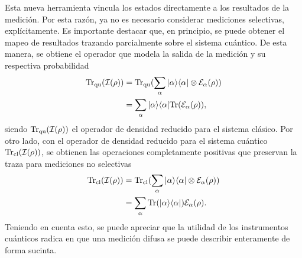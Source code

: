 

Esta nueva herramienta vincula los estados directamente a los resultados de la
medición. Por esta razón, ya no es necesario considerar mediciones selectivas,
explícitamente.  Es importante destacar que, en principio, se puede obtener el
mapeo de resultados trazando parcialmente sobre el sistema cuántico. De
esta manera, se obtiene el operador que modela la salida de la medición y su
respectiva probabilidad 
\begin{equation}
    \begin{split}
    {\rm Tr}_{\text{qu}}(\mathcal{I}(\rho))&={\rm Tr}_{\text{qu}}(\sum_\alpha |\alpha\rangle \langle\alpha|\otimes \mathcal{E}_\alpha(\rho))\\
    &=\sum_\alpha |\alpha\rangle \langle\alpha|{\rm Tr}(\mathcal{E}_\alpha(\rho)),
\end{split}
\end{equation}siendo ${\rm Tr}_{\text{qu}}(\mathcal{I}(\rho))$ el operador de densidad reducido para el sistema clásico. 
 
Por otro lado, con el operador de densidad reducido para el sistema cuántico
${\rm Tr}_{\text{cl}}(\mathcal{I}(\rho))$, se obtienen las operaciones completamente
positivas que preservan la traza para mediciones no selectivas
\begin{equation}
    \begin{split}
        {\rm Tr}_{\text{cl}}(\mathcal{I}(\rho))&={\rm Tr}_{\text{cl}} (\sum_\alpha |\alpha\rangle \langle\alpha|\otimes \mathcal{E}_\alpha(\rho))\\
        &=\sum_\alpha {\rm Tr}(|\alpha\rangle \langle\alpha|)\mathcal{E}_\alpha(\rho).
    \end{split}
\end{equation} Teniendo en cuenta esto, se puede apreciar que la utilidad de los instrumentos cuánticos radica en que una medición difusa se puede describir enteramente de forma sucinta. 


